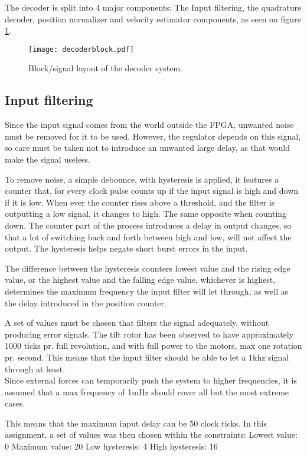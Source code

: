 The decoder is split into 4 major components: The Input filtering, the quadrature decoder, position normalizer and velocity estimator components, as seen on figure \ref{fig:decoderblock}. 



\begin{figure}[htb]
\centering
\texttt{[image: decoderblock.pdf]}
\caption{Block/signal layout of the decoder system.}
\label{fig:decoderblock}
\end{figure}


\subsection{Input filtering}
Since the input signal comes from the world outside the FPGA, unwanted noise must be removed for it to be used. However, the regulator depends on this signal, so care must be taken not to introduce an unwanted large delay, as that would make the signal  useless.

To remove noise, a simple debounce, with hysteresis is applied, it features a counter that, for every clock pulse counts up if the input signal is high and down if it is low.
When ever the counter rises above a threshold, and the filter is outputting a low signal, it changes to high. The same opposite when counting down.
The counter part of the process introduces a delay in output changes, so that a lot of switching back and forth between high and low, will not affect the output. The hysteresis helps negate short burst errors in the input. 

The difference between the hysteresis counters lowest value and the rising edge value, or the highest value and the falling edge value, whichever is highest, determines the maximum frequency the input filter will let through, as well as the delay introduced in the position counter.

A set of values must be chosen that filters the signal adequately, without producing error signals. The tilt rotor has been observed to have approximately 1000 ticks pr. full revolution, and with full power to the motors, max one rotation pr. second.
This means that the input filter should be able to let a 1khz signal through at least. \\ 
Since external forces can temporarily push the system to higher frequencies, it is assumed that a max frequency of 1mHz should cover all but the most extreme cases.

This means that the maximum input delay can be 50 clock ticks.
In this assignment, a set of values was then chosen within the constraints: 
Lowest value: 0
Maximum value: 20
Low hysteresis: 4
High hysteresis: 16

